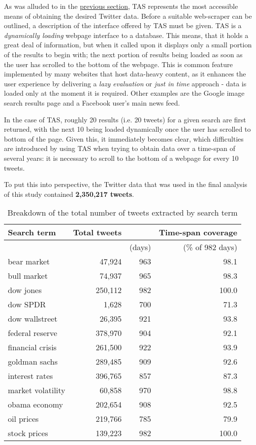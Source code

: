 \documentclass{article}
\begin{document}
As was alluded to in the \hyperref[TAS]{previous section}, TAS represents the most accessible means of obtaining the desired Twitter data. Before a suitable web-scraper can be outlined, a description of the interface offered by TAS must be given. TAS is a \emph{dynamically loading} webpage interface to a database. This means, that it holds a great deal of information, but when it called upon it displays only a small portion of the results to begin with; the next portion of results being loaded as soon as the user has scrolled to the bottom of the webpage. This is common feature implemented by many websites that host data-heavy content, as it enhances the user experience by delivering a \emph{lazy evaluation} or \emph{just in time} approach - data is loaded only at the moment it is required. Other examples are the Google image search results page and a Facebook user's main news feed.

In the case of TAS, roughly 20 results (i.e. 20 tweets) for a given search are first returned, with the next 10 being loaded dynamically once the user has scrolled to bottom of the page. Given this, it immediately becomes clear, which difficulties are introduced by using TAS when trying to obtain data over a time-span of several years: it is necessary to scroll to the bottom of a webpage for every 10 tweets.

To put this into perspective, the Twitter data that was used in the final analysis of this study contained \textbf{2,350,217 tweets}.

\begin{table}[htb]
\centering
\begin{tabular}{l|r|rr}
Search term & Total tweets &  & Time-span coverage\\
\hline
 &  & (days) & (\% of 982 days)\\
\hline
bear market & 47,924 & 963 & 98.1\\
bull market & 74,937 & 965 & 98.3\\
dow jones & 250,112 & 982 & 100.0\\
dow SPDR & 1,628 & 700 & 71.3\\
dow wallstreet & 26,395 & 921 & 93.8\\
federal reserve & 378,970 & 904 & 92.1\\
financial crisis & 261,500 & 922 & 93.9\\
goldman sachs & 289,485 & 909 & 92.6\\
interest rates & 396,765 & 857 & 87.3\\
market volatility & 60,858 & 970 & 98.8\\
obama economy & 202,654 & 908 & 92.5\\
oil prices & 219,766 & 785 & 79.9\\
stock prices & 139,223 & 982 & 100.0\\
\end{tabular}\caption{\label{tab.tweet-breakdown}Breakdown of the total number of tweets extracted by search term}

\end{table}
\end{document}

